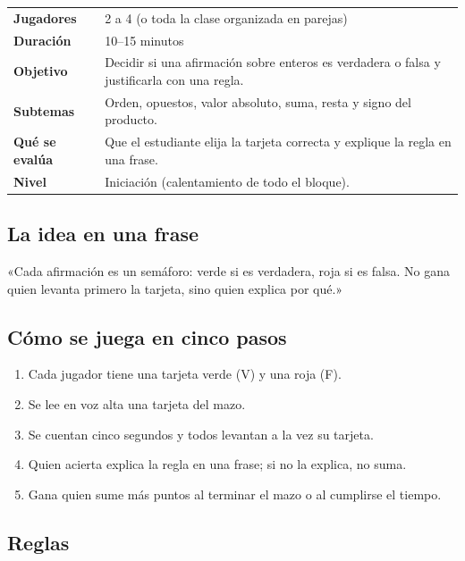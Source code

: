 \documentclass[12pt, letterpaper]{article}
\begin{document}
\begin{center}
\small
\begin{tabular}{@{}p{3cm} p{12.2cm}@{}}
\toprule
\textbf{Jugadores} & 2 a 4 (o toda la clase organizada en parejas)\\
\textbf{Duración} & 10--15 minutos\\
\textbf{Objetivo} & Decidir si una afirmación sobre enteros es verdadera o falsa y justificarla con una regla.\\
\textbf{Subtemas} & Orden, opuestos, valor absoluto, suma, resta y signo del producto.\\
\textbf{Qué se evalúa} & Que el estudiante elija la tarjeta correcta y explique la regla en una frase.\\
\textbf{Nivel} & Iniciación (calentamiento de todo el bloque).\\
\bottomrule
\end{tabular}
\end{center}

\subsection{La idea en una frase}

\begin{cuadroextra}
  «Cada afirmación es un semáforo: verde si es verdadera, roja si es falsa. No gana quien levanta primero la tarjeta, sino quien explica por qué.»
\end{cuadroextra}

\subsection{Cómo se juega en cinco pasos}

\begin{enumerate}[leftmargin=*]
  \item Cada jugador tiene una tarjeta verde (V) y una roja (F).
  \item Se lee en voz alta una tarjeta del mazo.
  \item Se cuentan cinco segundos y todos levantan a la vez su tarjeta.
  \item Quien acierta explica la regla en una frase; si no la explica, no suma.
  \item Gana quien sume más puntos al terminar el mazo o al cumplirse el tiempo.
\end{enumerate}

\subsection{Reglas}
\end{document}

